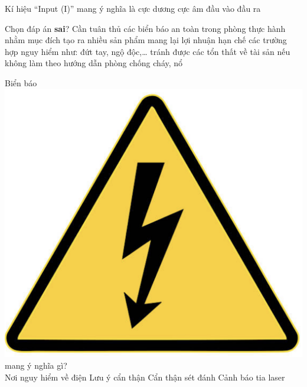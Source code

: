 \begin{ex}
	Kí hiệu “Input (I)” mang ý nghĩa là
	\choice
	{cực dương}
	{cực âm}
	{\True đầu vào}
	{đầu ra}
	\loigiai{}
\end{ex}

\begin{ex}
	Chọn đáp án \textbf{sai}? Cần tuân thủ các biển báo an toàn trong phòng thực hành nhằm mục đích
	\choice
	{\True tạo ra nhiều sản phẩm mang lại lợi nhuận}
	{hạn chế các trường hợp nguy hiểm như: đứt tay, ngộ độc,…}
	{tránh được các tổn thất về tài sản nếu không làm theo hướng dẫn}
	{phòng chống cháy, nổ}
	\loigiai{}
\end{ex}

\begin{ex}
	Biển báo \vspace{-0.5cm}\includegraphics[scale=0.1]{figs/G10Y25B1-5} mang ý nghĩa gì?\\
	\choice
	{\True Nơi nguy hiểm về điện}
	{Lưu ý cẩn thận}
	{Cẩn thận sét đánh}
	{Cảnh báo tia laser}
	\loigiai{}
\end{ex}

